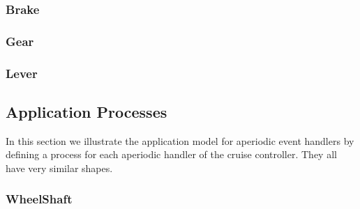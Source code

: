 \documentclass{article}
\begin{document}
\subsubsection{Brake}

\begin{circusbox}

\end{circusbox}

\subsubsection{Gear}

\begin{circusbox}

\end{circusbox}

\subsubsection{Lever}

\begin{circusbox}

\end{circusbox}

\newpage

\subsection{Application Processes}

In this section we illustrate the application model for aperiodic event handlers by defining a process for each aperiodic handler of the cruise controller. They all have very similar shapes.

\subsubsection{WheelShaft}

\newpage

\begin{circusbox}

\end{circusbox}

\newpage

\begin{circusbox}

\end{circusbox}

\newpage

\end{document}
